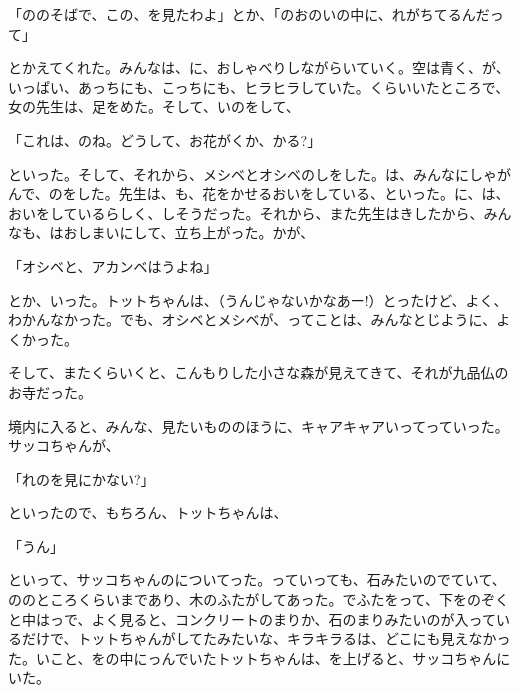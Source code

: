 「ののそばで、この、を見たわよ」とか、「のおのいの中に、れがちてるんだって」

とかえてくれた。みんなは、に、おしゃべりしながらいていく。空は青く、が、いっぱい、あっちにも、こっちにも、ヒラヒラしていた。くらいいたところで、女の先生は、足をめた。そして、いのをして、

「これは、のね。どうして、お花がくか、かる?」

といった。そして、それから、メシベとオシベのしをした。は、みんなにしゃがんで、のをした。先生は、も、花をかせるおいをしている、といった。に、は、おいをしているらしく、しそうだった。それから、また先生はきしたから、みんなも、はおしまいにして、立ち上がった。かが、

「オシベと、アカンベはうよね」

とか、いった。トットちゃんは、（うんじゃないかなあー!）とったけど、よく、わかんなかった。でも、オシベとメシベが、ってことは、みんなとじように、よくかった。

そして、またくらいくと、こんもりした小さな森が見えてきて、それが九品仏のお寺だった。

境内に入ると、みんな、見たいもののほうに、キャアキャアいってっていった。サッコちゃんが、

「れのを見にかない?」

といったので、もちろん、トットちゃんは、

「うん」

といって、サッコちゃんのについてった。っていっても、石みたいのでていて、ののところくらいまであり、木のふたがしてあった。でふたをって、下をのぞくと中はっで、よく見ると、コンクリートのまりか、石のまりみたいのが入っているだけで、トットちゃんがしてたみたいな、キラキラるは、どこにも見えなかった。いこと、をの中にっんでいたトットちゃんは、を上げると、サッコちゃんにいた。

